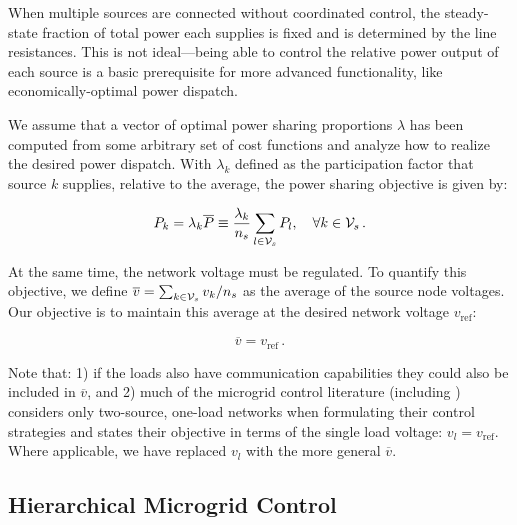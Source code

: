 \documentclass[letterpaper, 10 pt, conference]{ieeeconf}
\begin{document}
When multiple sources are connected without coordinated control, the steady-state fraction of total power each supplies is fixed and is determined by the line resistances. This is not ideal---being able to control the relative power output of each source is a basic prerequisite for more advanced functionality, like economically-optimal power dispatch.

We assume that a vector of optimal power sharing proportions $\lambda$ has been computed from some arbitrary set of cost functions and analyze how to realize the desired power dispatch. With $\lambda_k$ defined as the participation factor that source $k$ supplies, relative to the average, the power sharing objective is given by:

\begin{equation}\label{eq:sharing}
    P_k = \lambda_k \overline{P} \equiv \frac{\lambda_k}{n_s}\sum_{l \in{\cal V}_s} P_l,\quad \forall k \in {\cal V}_s\,.
\end{equation}

At the same time, the network voltage must be regulated. To quantify this objective, we define $\overline{v} = \sum_{k \in{\cal V}_s} v_k/n_s$ as the average of the source node voltages. Our objective is to maintain this average at the desired network voltage $v_{\mathrm{ref}}$:

\begin{equation}\label{eq:avevolt}
	\overline{v} = v_{\mathrm{ref}}\,.
\end{equation}

\noindent Note that: 1) if the loads also have communication capabilities they could also be included in $\overline{v}$, and 2) much of the microgrid control literature (including \cite{GuerreroHierarchy}) considers only two-source, one-load networks when formulating their control strategies and states their objective in terms of the single load voltage: $v_l = v_{\mathrm{ref}}$. Where applicable, we have replaced $v_l$ with the more general $\overline{v}$.


\subsection{Hierarchical Microgrid Control}
\end{document}
